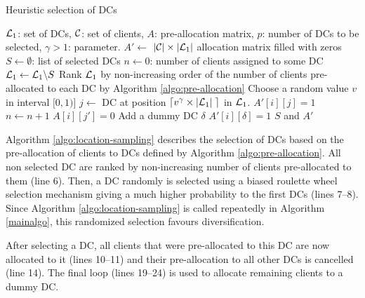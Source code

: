 \documentclass[a4paper,10pt]{article}
\begin{document}
\begin{linenumbers}
\begin{algorithm}
	\caption{Heuristic selection of DCs}
	\label{algo:location-sampling}
	\begin{algorithmic}[1]
		\REQUIRE $\mathcal{L}_1$: set of DCs, $\mathcal{C}$: set of clients, $A$: pre-allocation matrix, $p$: number of DCs to be selected, $\gamma>1$: parameter.
		\STATE  $A' \leftarrow$  $|\mathcal{C}| \times |\mathcal{L}_1|$ allocation matrix filled with zeros
		\STATE $S \leftarrow \emptyset$: list of selected DCs
		\STATE $n \leftarrow 0$: number of clients assigned to some DC
			\STATE $ \mathcal{L}_1 \leftarrow \mathcal{L}_1 \backslash S$
			\STATE Rank $\mathcal{L}_1$ by non-increasing order of the number of clients pre-allocated to each DC by Algorithm 
\ref{algo:pre-allocation}
			\STATE Choose a random value $v$ in interval $[0,1)$]
			\STATE $j \leftarrow$ DC at position $\lceil v^\gamma \times |\mathcal{L}_1| \; \rceil$ in $\mathcal{L}_1$.
					\STATE $A'[i][j] = 1$
					\STATE $n \leftarrow n+1$
						\STATE $A[i][j'] = 0$ 
					\ENDFOR
				\ENDIF		
			\ENDFOR
		\ENDWHILE
			\STATE Add a dummy DC $\delta$
				\STATE $A'[i][\delta]=1$
			\ENDFOR
		\ENDIF
		\RETURN $S$ and $A'$
	\end{algorithmic}
\end{algorithm}

 Algorithm \ref{algo:location-sampling} describes the selection of DCs based on the pre-allocation of clients to DCs defined by Algorithm \ref{algo:pre-allocation}. 
All non selected DC are ranked by non-increasing number of clients pre-allocated to them (line 6).
Then, a DC randomly is selected using a biased roulette wheel selection mechanism giving a much higher probability to the first DCs (lines 7--8). 
Since Algorithm \ref{algo:location-sampling} is called repeatedly in Algorithm \ref{mainalgo}, this randomized selection favours diversification. 

After selecting a DC, all clients that were pre-allocated to this DC are now allocated to it (lines 10--11) 
and their pre-allocation to all other DCs is cancelled (line 14). 
The final loop (lines 19--24) is used to allocate remaining clients to a dummy DC. 



\end{linenumbers}
\end{document}
